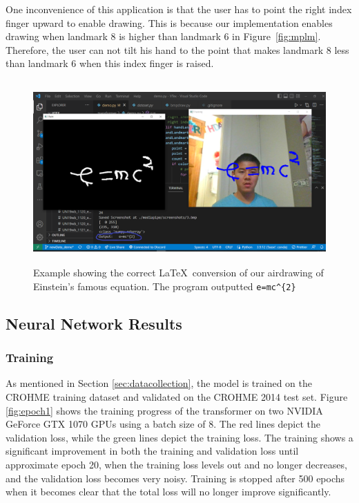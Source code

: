 One inconvenience of this application is that the user has to point the right index finger upward to enable drawing. This is because our implementation enables drawing when landmark 8 is higher than landmark 6 in Figure~\ref{fig:mplm}. Therefore, the user can not tilt his  hand to the point that makes landmark 8 less than landmark 6 when this index finger is raised. 


\begin{figure}[h!]
    \centering
    \includegraphics[width=15cm, height=7cm]{images/mc.png}
    \cprotect\caption{Example showing the correct \LaTeX\ conversion of our airdrawing of Einstein's famous equation. The program outputted \verb|e=mc^{2}|}
    \label{fig:mpmc}
\end{figure}


\subsection{Neural Network Results}
\subsubsection{Training}
As mentioned in Section \ref{sec:datacollection}, the model is trained on the CROHME training dataset and validated on the CROHME 2014 test set. Figure \ref{fig:epoch1} shows the training progress of the transformer on two NVIDIA GeForce GTX 1070 GPUs using a batch size of 8. The red lines depict the validation loss, while the green lines depict the training loss. The training shows a significant improvement in both the training and validation loss until approximate epoch 20, when the training loss levels out and no longer decreases, and the validation loss becomes very noisy. Training is stopped after 500 epochs when it becomes clear that the total loss will no longer improve significantly. 

